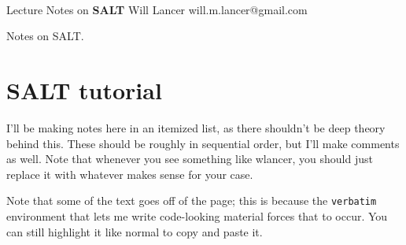 \documentclass[11pt]{article}
\begin{document}
\thispagestyle{empty}
\bigskip \
\vspace{0.1cm}

\begin{center}
{\fontsize{22}{22} \selectfont Lecture Notes on}
\vskip 16pt
{\fontsize{36}{36} \selectfont \bf \sffamily SALT}
\vskip 24pt
{\fontsize{18}{18} \selectfont \rmfamily Will Lancer} 
\vskip 6pt
{\fontsize{14}{14} \selectfont \ttfamily will.m.lancer@gmail.com} 
\vskip 24pt
\end{center}

{\parindent0pt \baselineskip=15.5pt}
\noin
Notes on SALT.

\newpage
\microtoc
\newpage


\section{SALT tutorial}

I'll be making notes here in an itemized list, as there shouldn't be
deep theory behind this. These should be roughly in sequential
order, but I'll make comments as well. Note that whenever you
see something like wlancer, you should just replace it with whatever
makes sense for your case.

Note that some of the text goes off of the page; this is because
the \verb|verbatim| environment that lets me write code-looking
material forces that to occur. You can still highlight it like normal
to copy and paste it.
\end{document}
